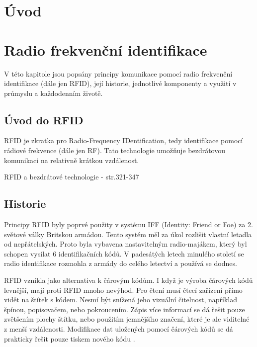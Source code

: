 
\chapter{Úvod}
\label{uvod}

\chapter{Radio frekvenční identifikace}
\label{technologie_rfid}
V této kapitole jsou popsány principy komunikace pomocí radio frekvenční identifikace (dále jen RFID), její historie, jednotlivé komponenty a využití v průmyslu a každodenním životě.

\section{Úvod do RFID}
RFID je zkratka pro {Radio-Frequency IDentification}, tedy identifikace pomocí rádiové frekvence (dále jen RF). Tato technologie umožňuje bezdrátovou komunikaci na relativně krátkou vzdálenost\cite{The_RF_in_RFID}.
\par
RFID a bezdrátové technologie \cite{Smart_Cards_Tokens_Security}{ - str.321-347}

\section{Historie}
Principy RFID byly poprvé použity v systému IFF (Identity: Friend or Foe) za 2. světové války Britskou armádou. Tento systém měl za úkol rozlišit vlastní letadla od nepřátelských. Proto byla vybavena nastavitelným {radio-majákem}, který byl schopen vysílat 6 identifikačních kódů. V padesátých letech minulého století se radio identifikace rozmohla z armády do celého letectví a používá se dodnes. %
\par
RFID vznikla jako alternativa k čárovým kódům. I když je výroba čárových kódů levnější, mají proti RFID mnoho nevýhod. Pro čtení musí čtecí zařízení přímo vidět na štítek s kódem. Nesmí být snížená jeho vizuální čitelnost, například špínou, popisovačem, nebo pokroucením. Zápis více informací se dá řešit pouze zvětšením plochy štítku, nebo použitím jemnějšího značení, které je ale viditelné z menší vzdálenosti. Modifikace dat uložených pomocí čárových kódů se dá prakticky řešit pouze tiskem nového kódu \cite{The_RF_in_RFID}\cite{Emulator_UHD_RFID_Tagu}.

